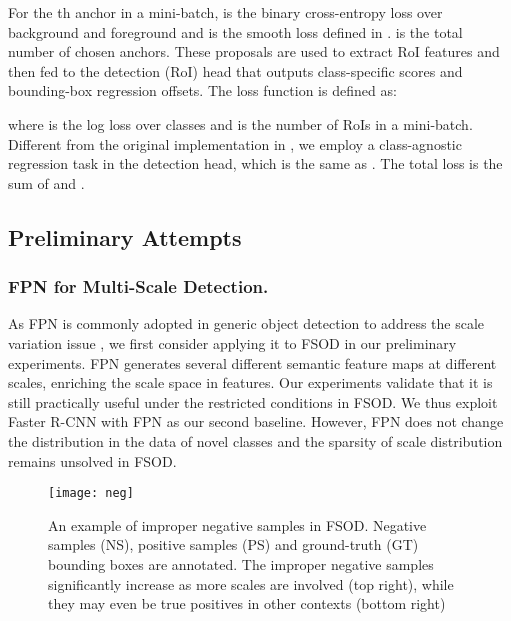 \documentclass[runningheads]{llncs}
\begin{document}
For the th anchor in a mini-batch,  is the binary cross-entropy loss over background and foreground and  is the smooth  loss defined in \cite{fasterrcnn}.  is the total number of chosen anchors. 
These proposals are used to extract RoI features and then fed to the detection (RoI) head that outputs class-specific scores and bounding-box regression offsets. 
The loss function is defined as:

where  is the log loss over  classes and  is the number of RoIs in a mini-batch. 
Different from the original implementation in \cite{fasterrcnn}, we employ a class-agnostic regression task in the detection head, which is the same as \cite{lstd}.
The total loss is the sum of  and .

\subsection{Preliminary Attempts}

\subsubsection{FPN for Multi-Scale Detection.}
As FPN is commonly adopted in generic object detection to address the scale variation issue \cite{fpn,cascade}, we first consider applying it to FSOD in our preliminary experiments. 
FPN generates several different semantic feature maps at different scales, enriching the scale space in features.  
Our experiments validate that it is still practically useful under the restricted conditions in FSOD. 
We thus exploit Faster R-CNN with FPN as our second baseline.
However, FPN does not change the distribution in the data of novel classes and the sparsity of scale distribution remains unsolved in FSOD.

\begin{figure}
	\centering
	\texttt{[image: neg]}
	\caption{An example of improper negative samples in FSOD. Negative samples (NS), positive samples (PS) and ground-truth (GT) bounding boxes are annotated. The improper negative samples significantly increase as more scales are involved (top right), while they may even be true positives in other contexts (bottom right)}
	\label{fig:neg}
\end{figure}
\end{document}

